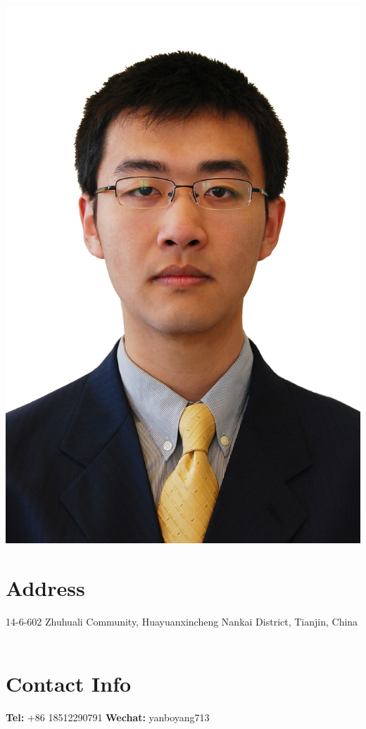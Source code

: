 \documentclass[]{friggeri-cv}
\begin{document}
     

\begin{aside}
  \includegraphics[scale=0.007]{img/boyang.png}
  \section{Address}
  14-6-602 Zhuhuali Community, Huayuanxincheng
  Nankai District,  Tianjin,
  China
    ~
  \section{Contact Info}
  \textbf{Tel:} +86 18512290791
    \textbf{Wechat:} yanboyang713
    ~

\end{aside}
\end{document}
